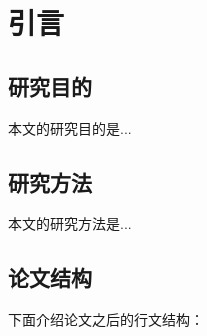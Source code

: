 \chapter{引言}

\section{研究目的}
本文的研究目的是...
\section{研究方法}
\par
本文的研究方法是...
\section{论文结构}
\par
下面介绍论文之后的行文结构：

